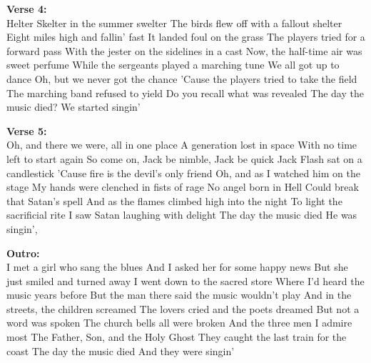 \documentclass[../../songbookMain]{subfiles}
\begin{document}
\begin{guitar}
\begin{multicols}{3}
\textbf{Verse 4:}\\
Helter Skelter in the summer swelter
The birds flew off with a fallout shelter
Eight miles high and fallin' fast
It landed foul on the grass
The players tried for a forward pass
With the jester on the sidelines in a cast
Now, the half-time air was sweet perfume
While the sergeants played a marching tune
We all got up to dance
Oh, but we never got the chance
'Cause the players tried to take the field
The marching band refused to yield
Do you recall what was revealed
The day the music died?
We started singin'

\textbf{Verse 5:}\\
Oh, and there we were, all in one place
A generation lost in space
With no time left to start again
So come on, Jack be nimble, Jack be quick
Jack Flash sat on a candlestick
'Cause fire is the devil's only friend
Oh, and as I watched him on the stage
My hands were clenched in fists of rage
No angel born in Hell
Could break that Satan's spell
And as the flames climbed high into the night
To light the sacrificial rite
I saw Satan laughing with delight
The day the music died
He was singin',

\textbf{Outro:}\\
I met a girl who sang the blues
And I asked her for some happy news
But she just smiled and turned away
I went down to the sacred store
Where I'd heard the music years before
But the man there said the music wouldn't play
And in the streets, the children screamed
The lovers cried and the poets dreamed
But not a word was spoken
The church bells all were broken
And the three men I admire most
The Father, Son, and the Holy Ghost
They caught the last train for the coast
The day the music died
And they were singin'
\end{multicols}

\end{guitar}
\end{document}
